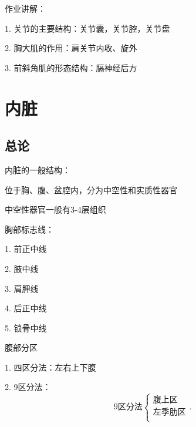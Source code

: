 \begin{notation}
    作业讲解：

    1. 关节的主要结构：关节囊，关节腔，关节盘

    2. 胸大肌的作用：肩关节内收、旋外

    3. 前斜角肌的形态结构：膈神经后方
\end{notation}
\section{内脏}%
\label{sec:内脏}
\subsection{总论}%
\label{sub:内脏总论}
\begin{notation}
    内脏的一般结构：

    位于胸、腹、盆腔内，分为中空性和实质性器官

    中空性器官一般有3-4层组织
\end{notation}
胸部标志线：

1. 前正中线

2. 腋中线

3. 肩胛线

4. 后正中线

5. 锁骨中线

腹部分区

1. 四区分法：左右上下腹

2. 9区分法：
\[
    \text{9区分法}\begin{cases}
        \text{腹上区}\\
        \text{左季肋区}\\
    \end{cases}
.\] 
